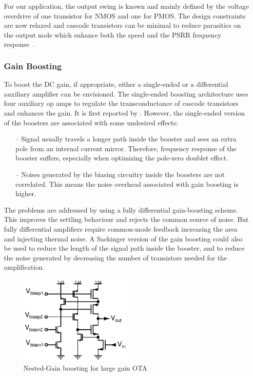 For our application, the output swing is known and mainly defined by the voltage overdrive of one transistor for NMOS and one for PMOS\@. The design constraints are now relaxed and cascode transistors can be minimal to reduce parasitics on the output node which enhance both the speed and the PSRR frequency response~\cite{Ribner1984}.

\subsubsection{Gain Boosting}
To boost the DC gain, if appropriate, either a single-ended or a differential auxiliary amplifier can be envisioned. The single-ended boosting architecture uses four auxiliary op amps to regulate the transconductance of cascode transistors and enhances the gain. It is first reported by \cite{Bult1990}. However, the single-ended version of the boosters are associated with some undesired effects:
\begin{itemize}
    \itemsep-0.5em
    \item[--] Signal usually travels a longer path inside the booster and sees an extra pole from an internal current mirror. Therefore, frequency response of the booster suffers, especially when optimizing the pole-zero doublet effect.
    \item[--] Noises generated by the biasing circuitry inside the boosters are not correlated. This means the noise overhead associated with gain boosting is higher.
\end{itemize}
The problems are addressed by using a fully differential gain-boosting scheme. This improves the settling behaviour and rejects the common source of noise. But fully differential amplifiers require common-mode feedback increasing the area and injecting thermal noise. A Sackinger version of the gain boosting could also be used to reduce the length of the signal path inside the booster, and to reduce the noise generated by decreasing the number of transistors needed for the amplification.

\begin{figure}[htp]
    \centering
    \includegraphics[width=0.5\textwidth]{Chapter7/Figs/gain-boosting.ps}
    \caption{Nested-Gain boosting for large gain OTA}
    \label{fig:nmos-nested-gain-boosting}
\end{figure}

